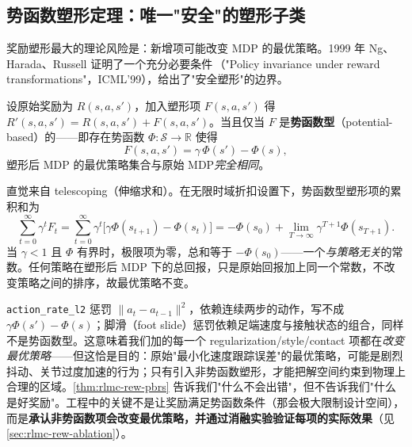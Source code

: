 \subsection{势函数塑形定理：唯一"安全"的塑形子类}
\label{sec:rlmc-rew-pbrs}

奖励塑形最大的理论风险是：新增项可能改变 MDP 的最优策略。1999 年 Ng、Harada、Russell 证明了一个充分必要条件\,\cite{ng1999shaping}（"Policy invariance under reward transformations"，ICML'99），给出了"安全塑形"的边界。

\begin{theorem}\label{thm:rlmc-rew-pbrs}
设原始奖励为 $R(s,a,s')$，加入塑形项 $F(s,a,s')$ 得 $R'(s,a,s')=R(s,a,s')+F(s,a,s')$。当且仅当 $F$ 是\textbf{势函数型}（potential-based）的——即存在势函数 $\Phi:\mathcal S\to\mathbb R$ 使得
\begin{equation}
F(s,a,s')=\gamma\,\Phi(s')-\Phi(s),
\label{eq:rlmc-rew-pbrs}
\end{equation}
塑形后 MDP 的最优策略集合与原始 MDP\emph{完全相同}。
\end{theorem}

\begin{derivation}
直觉来自 telescoping（伸缩求和）。在无限时域折扣设置下，势函数型塑形项的累积和为
\begin{equation}
\sum_{t=0}^{\infty}\gamma^{t}F_t=\sum_{t=0}^{\infty}\gamma^{t}\big[\gamma\Phi(s_{t+1})-\Phi(s_t)\big]
=-\Phi(s_0)+\lim_{T\to\infty}\gamma^{T+1}\Phi(s_{T+1}).
\label{eq:rlmc-rew-telescope}
\end{equation}
当 $\gamma<1$ 且 $\Phi$ 有界时，极限项为零，总和等于 $-\Phi(s_0)$——一个\emph{与策略无关}的常数。任何策略在塑形后 MDP 下的总回报，只是原始回报加上同一个常数，不改变策略之间的排序，故最优策略不变。
\end{derivation}

\begin{insight}\label{ins:rlmc-rew-nonpotential}
\verb|action_rate_l2| 惩罚 $\lVert a_t-a_{t-1}\rVert^2$，依赖连续两步的动作，写不成 $\gamma\Phi(s')-\Phi(s)$；脚滑（foot slide）惩罚依赖足端速度与接触状态的组合，同样不是势函数型。这意味着我们加的每一个 regularization/style/contact 项都在\emph{改变最优策略}——但这恰是目的：原始"最小化速度跟踪误差"的最优策略，可能是剧烈抖动、关节过度加速的行为；只有引入非势函数塑形，才能把解空间约束到物理上合理的区域。\cref{thm:rlmc-rew-pbrs} 告诉我们"什么不会出错"，但不告诉我们"什么是好奖励"。工程中的关键不是让奖励满足势函数条件（那会极大限制设计空间），而是\textbf{承认非势函数项会改变最优策略，并通过消融实验验证每项的实际效果}（见 \cref{sec:rlmc-rew-ablation}）。
\end{insight}

